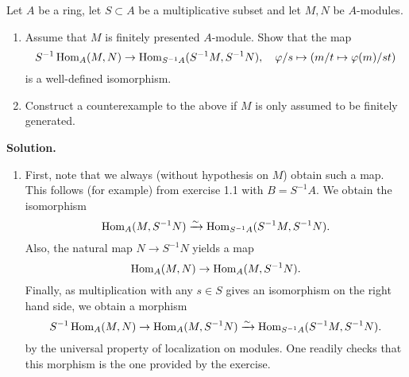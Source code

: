\documentclass[a4paper,11pt]{article}
\begin{document}
Let $A$ be a ring, let $S \subset A$ be a multiplicative subset and let 
$M,N$ be $A$-modules.
\begin{enumerate}
    \item Assume that $M$ is finitely presented $A$-module. Show that the
        map 
        \begin{equation*}
            S^{-1} \operatorname{Hom}_A(M,N) \to \operatorname{Hom}_{S^{-1}A}(S^{-1}M, S^{-1}N), \quad
            \varphi/s \mapsto (m/t \mapsto \varphi(m)/st)
        \end{equation*}
        is a well-defined isomorphism.
    \item Construct a counterexample to the above if $M$ is only assumed
        to be finitely generated.
\end{enumerate}
\textbf{Solution.}
\begin{enumerate}
    \item First, note that we always (without hypothesis on $M$) obtain such a
        map. This follows (for example) from exercise 1.1 with $B = S^{-1}A$.
        We obtain the isomorphism
        \begin{equation*}
            \operatorname{Hom}_A(M, S^{-1}N) \xrightarrow{\sim} \operatorname{Hom}_{S^{-1}A}(S^{-1} M, S^{-1}N).
        \end{equation*}
        Also, the natural map $N \to S^{-1}N$ yields a map 
        \begin{equation*}
            \operatorname{Hom}_A(M, N) \to \operatorname{Hom}_A(M,S^{-1}N).
        \end{equation*}
        Finally, as multiplication with any $s \in S$ gives an isomorphism on the right hand
        side, we obtain a morphism
        \begin{equation*}
            S^{-1}\operatorname{Hom}_A(M, N) \to \operatorname{Hom}_A(M,S^{-1}N) \xrightarrow{\sim} \operatorname{Hom}_{S^{-1}A}(S^{-1} M, S^{-1}N).
        \end{equation*}
        by the universal property of localization on modules. One readily checks that 
        this morphism is the one provided by the exercise.


\end{enumerate}
\end{document}
